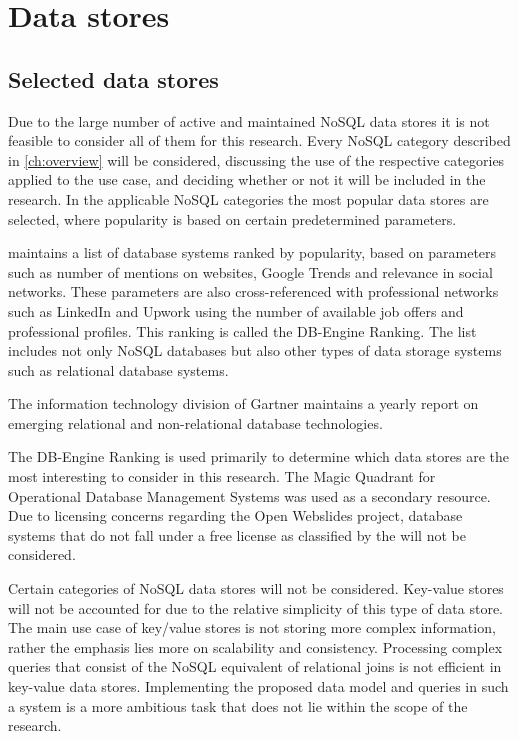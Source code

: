 \chapter{Data stores}
\label{ch:data-stores}

\section{Selected data stores}
\label{sec:selected-data-stores}

Due to the large number of active and maintained NoSQL data stores it is not feasible to consider all of them for this research.
Every NoSQL category described in \cref{ch:overview} will be considered, discussing the use of the respective categories applied to the use case, and deciding whether or not it will be included in the research.
In the applicable NoSQL categories the most popular data stores are selected, where popularity is based on certain predetermined parameters.

\textcite{DBEngine2018} maintains a list of database systems ranked by popularity, based on parameters such as number of mentions on websites, Google Trends and relevance in social networks.
These parameters are also cross-referenced with professional networks such as LinkedIn and Upwork using the number of available job offers and professional profiles.
This ranking is called the DB-Engine Ranking.
The list includes not only NoSQL databases but also other types of data storage systems such as relational database systems.

The information technology division of Gartner maintains a yearly report on emerging relational and non-relational database technologies.

The DB-Engine Ranking is used primarily to determine which data stores are the most interesting to consider in this research.
The Magic Quadrant for Operational Database Management Systems was used as a secondary resource.
Due to licensing concerns regarding the Open Webslides project, database systems that do not fall under a free license as classified by the \textcite{FreeSoftwareFoundation1985} will not be considered.

Certain categories of NoSQL data stores will not be considered.
Key-value stores will not be accounted for due to the relative simplicity of this type of data store.
The main use case of key/value stores is not storing more complex information, rather the emphasis lies more on scalability and consistency.
Processing complex queries that consist of the NoSQL equivalent of relational joins is not efficient in key-value data stores.
Implementing the proposed data model and queries in such a system is a more ambitious task that does not lie within the scope of the research.

